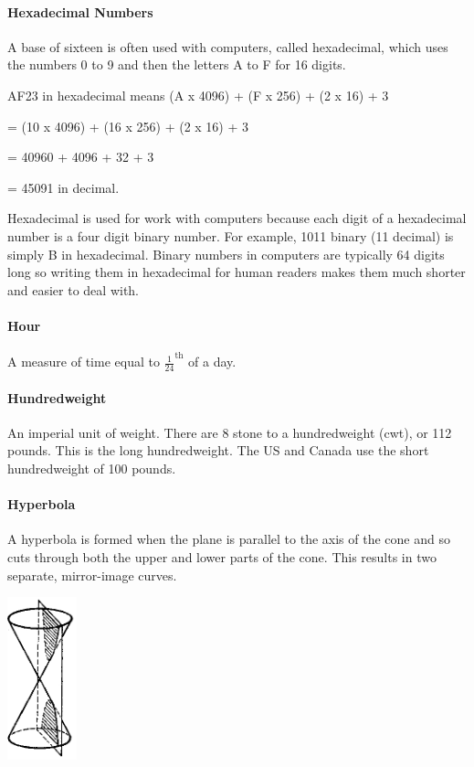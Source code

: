 \documentclass[12pt]{article}
\begin{document}
\paragraph{Hexadecimal Numbers}
A base of sixteen is often used with computers, called hexadecimal, which uses the numbers 0 to 9 and then the letters A to F for 16 digits.

AF23 in hexadecimal means	(A x 4096) + (F x 256) + (2 x 16) + 3

= (10 x 4096) + (16 x 256) + (2 x 16) + 3

= 40960 + 4096 + 32 + 3

= 45091 in decimal.

Hexadecimal is used for work with computers because each digit of a hexadecimal number is a four digit binary number. For example, 1011 binary (11 decimal) is simply B in hexadecimal. Binary numbers in computers are typically 64 digits long so writing them in hexadecimal for human readers makes them much shorter and easier to deal with.

\paragraph{Hour}
A measure of time equal to $\frac{1}{24}^{\textrm{th}}$ of a day.

\paragraph{Hundredweight}
An imperial unit of weight. There are 8 stone to a hundredweight (cwt), or 112 pounds. This is the long hundredweight. The US and Canada use the short hundredweight of 100 pounds.

\paragraph{Hyperbola}
A hyperbola is formed when the plane is parallel to the axis of the cone and so cuts through both the upper and lower parts of the cone. This results in two separate, mirror-image curves.

\begin{center}
\includegraphics[width=0.15\textwidth]{hyperbola conic section.jpg}
\end{center}
\end{document}
